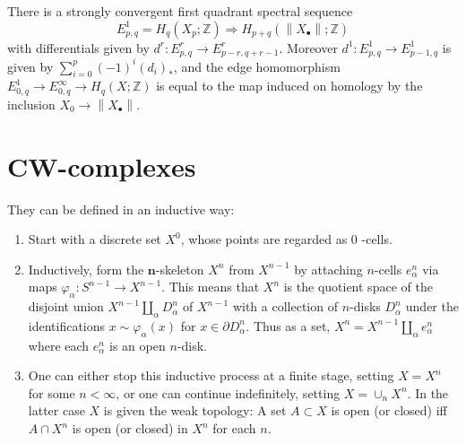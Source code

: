 \begin{theo}
    There is a strongly convergent first quadrant spectral sequence
    $$
    E_{p, q}^1=H_q\left(X_p ; \mathbb{Z}\right) \Longrightarrow H_{p+q}\left(\left\|X_{\bullet}\right\| ; \mathbb{Z}\right)
    $$
    with differentials given by $d^r: E_{p, q}^r \rightarrow E_{p-r, q+r-1}^r$. Moreover $d^1: E_{p, q}^1 \rightarrow E_{p-1, q}^1$ is given by $\sum_{i=0}^p(-1)^i\left(d_i\right)_*$, and the edge homomorphism $E_{0, q}^1 \rightarrow E_{0, q}^{\infty} \rightarrow H_q(X ; \mathbb{Z})$ is equal to the map induced on homology by the inclusion $X_0 \rightarrow\left\|X_{\bullet}\right\|$.   
\end{theo}







\section{CW-complexes}

They can be defined in an inductive way:

\begin{enumerate}
    \item Start with a discrete set $X^0$, whose points are regarded as 0 -cells.
    \item Inductively, form the $\boldsymbol{n}$-skeleton $X^n$ from $X^{n-1}$ by attaching $n$-cells $e_\alpha^n$ via maps $\varphi_\alpha: S^{n-1} \rightarrow X^{n-1}$. This means that $X^n$ is the quotient space of the disjoint union $X^{n-1} \amalg_\alpha D_\alpha^n$ of $X^{n-1}$ with a collection of $n$-disks $D_\alpha^n$ under the identifications $x \sim \varphi_\alpha(x)$ for $x \in \partial D_\alpha^n$. Thus as a set, $X^n=X^{n-1} \amalg_\alpha e_\alpha^n$ where each $e_\alpha^n$ is an open $n$-disk.
    \item One can either stop this inductive process at a finite stage, setting $X=X^n$ for some $n<\infty$, or one can continue indefinitely, setting $X=\cup_n X^n$. In the latter case $X$ is given the weak topology: A set $A \subset X$ is open (or closed) iff $A \cap X^n$ is open (or closed) in $X^n$ for each $n$.
    
\end{enumerate}

